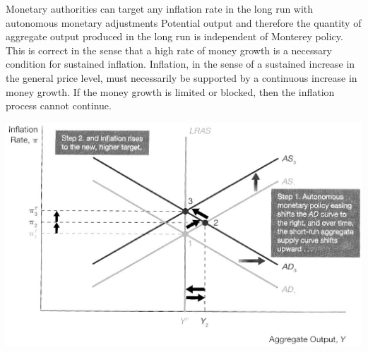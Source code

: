 \documentclass[12pt]{examnotes}
\begin{document}
\ra Monetary authorities can target any inflation rate in the long run with autonomous monetary adjustments
\ra Potential output and therefore the quantity of aggregate output produced in the long run is independent of Monterey policy.
\ra This is correct in the sense that a high rate of money growth is a necessary condition for sustained inflation. 
\ra Inflation, in the sense of a sustained increase in the general price level, must necessarily be supported by a continuous increase in money growth. If the money growth is limited or blocked, then the inflation process cannot continue.

\includegraphics[scale=0.5]{./imgs/241.jpg}
\end{document}
